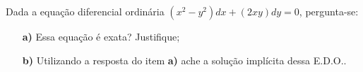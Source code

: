\linespread{1.5}
Dada a equação diferencial ordinária $(x^2 - y^2)dx + (2xy)dy = 0$, pergunta-se:
\begin{itemize}
    \item[\textbf{a)}] Essa equação é exata? Justifique;
    \item[\textbf{b)}] Utilizando a resposta do item \textbf{a)} ache a solução implícita dessa E.D.O..
\end{itemize}